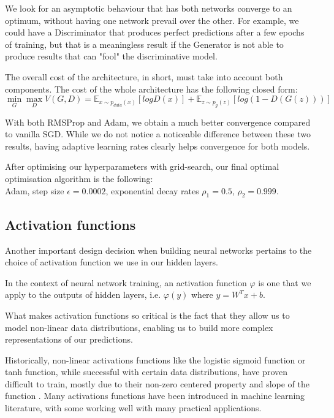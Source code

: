 We look for an asymptotic behaviour that has both networks converge to an optimum, without having one network prevail over the other. For example, we could have a Discriminator that produces perfect predictions after a few epochs of training, but that is a meaningless result if the Generator is not able to produce results that can "fool" the discriminative model.

The overall cost of the architecture, in short, must take into account both components. The cost of the whole architecture has the following closed form:
\[\min_{G} \max_{D} V(G, D) = \mathbb{E}_{x\sim p_{data}(x)}[log D(x)] + \mathbb{E}_{z \sim p_{g}(z)}[log(1-D(G(z)))] \]

With both RMSProp and Adam, we obtain a much better convergence compared to vanilla SGD. While we do not notice a noticeable difference between these two results, having adaptive learning rates clearly helps convergence for both models.

After optimising our hyperparameters with grid-search, our final optimal optimisation algorithm is the following: \\
Adam, step size $\epsilon = 0.0002$, exponential decay rates $\rho_1 = 0.5$, $\rho_2 = 0.999$.




\subsection{Activation functions}
Another important design decision when building neural networks pertains to the choice of activation function we use in our hidden layers.

In the context of neural network training, an activation function $\varphi$ is one that we apply to the outputs of hidden layers, i.e. $\varphi(y)$ where $y=W^Tx + b$.

What makes activation functions so critical is the fact that they allow us to model non-linear data distributions, enabling us to build more complex representations of our predictions.

Historically, non-linear activations functions like the logistic sigmoid function or tanh function, while successful with certain data distributions, have proven difficult to train, mostly due to their non-zero centered property and slope of the function \citep{DBLP:journals/corr/XuHL16}.
Many activations functions have been introduced in machine learning literature, with some working well with many practical applications.

